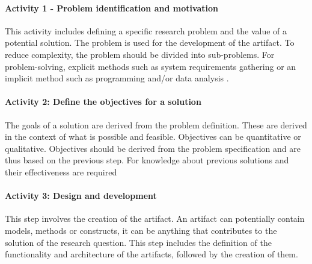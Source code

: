 

\paragraph{Activity 1 - Problem identification and motivation}
This activity includes defining a specific research problem and the value of a potential solution.
The problem is used for the development of the artifact.
To reduce complexity, the problem should be divided into sub-problems.
For problem-solving, explicit methods such as system requirements
gathering or an implicit method such as programming and/or data analysis
\cite[p. 52]{peffers_designscienceresearch_2007}.


\paragraph{Activity 2: Define the objectives for a solution}
The goals of a solution are derived from the problem definition. These are derived in the context
of what is possible and feasible.
Objectives can be quantitative or qualitative. Objectives should be derived from the
problem specification and are thus based on the previous step.
For knowledge about previous solutions and their effectiveness are required
\cite[p. 55]{peffers_designscienceresearch_2007}

\paragraph{Activity 3: Design and development}
This step involves the creation of the artifact. An artifact can potentially contain models,
methods or constructs, it can be anything that contributes to the solution of the research question.
This step includes the definition of the functionality and architecture of the artifacts,
followed by the creation of them.
\cite[p. 55]{peffers_designscienceresearch_2007}

